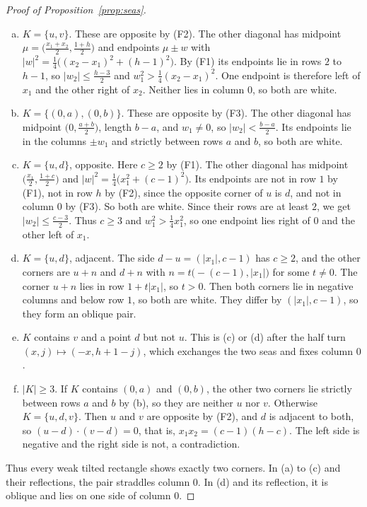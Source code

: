 \begin{proof}[Proof of Proposition~\ref{prop:seas}]
\begin{enumerate}[(a)]
\item $K=\{u,v\}$. These are opposite by (F2). The other diagonal has midpoint
$\mu=\bigl(\frac{x_1+x_2}2,\frac{1+h}2\bigr)$ and endpoints $\mu\pm w$ with
$|w|^2=\frac14\bigl((x_2-x_1)^2+(h-1)^2\bigr)$. By (F1) its endpoints lie in rows $2$ to $h-1$,
so $|w_2|\le\frac{h-3}2$ and $w_1^2>\frac14(x_2-x_1)^2$. One endpoint is therefore left of $x_1$ and the other right of $x_2$.
Neither lies in column $0$, so both are white.
\item $K=\{(0,a),(0,b)\}$. These are opposite by (F3). The other diagonal has midpoint
$\bigl(0,\frac{a+b}2\bigr)$, length $b-a$, and $w_1\ne0$, so $|w_2|<\frac{b-a}2$. Its endpoints
lie in the columns $\pm w_1$ and strictly between rows $a$ and $b$, so both are white.
\item $K=\{u,d\}$, opposite. Here $c\ge2$ by (F1). The other diagonal has midpoint
$\bigl(\frac{x_1}2,\frac{1+c}2\bigr)$ and $|w|^2=\frac14\bigl(x_1^2+(c-1)^2\bigr)$. Its endpoints
are not in row $1$ by (F1), not in row $h$ by (F2), since the opposite corner of $u$ is $d$, and
not in column $0$ by (F3). So both are white. Since their rows are at least $2$, we get
$|w_2|\le\frac{c-3}2$. Thus $c\ge3$ and $w_1^2>\frac14x_1^2$, so one endpoint lies right of $0$ and the other left of $x_1$.
\item $K=\{u,d\}$, adjacent. The side $d-u=(|x_1|,c-1)$ has $c\ge2$, and the other corners are
$u+n$ and $d+n$ with $n=t\bigl(-(c-1),|x_1|\bigr)$ for some $t\ne0$. The corner $u+n$ lies in row
$1+t|x_1|$, so $t>0$. Then both corners lie in negative columns and below row $1$, so both are
white. They differ by $(|x_1|,c-1)$, so they form an oblique pair.
\item $K$ contains $v$ and a point $d$ but not $u$. This is (c) or (d) after the half turn
$(x,j)\mapsto(-x,h+1-j)$, which exchanges the two seas and fixes column $0$.
\item $|K|\ge3$. If $K$ contains $(0,a)$ and $(0,b)$, the other two corners lie strictly between
rows $a$ and $b$ by (b), so they are neither $u$ nor $v$. Otherwise $K=\{u,d,v\}$. Then $u$ and
$v$ are opposite by (F2), and $d$ is adjacent to both, so $(u-d)\cdot(v-d)=0$, that is,
$x_1x_2=(c-1)(h-c)$. The left side is negative and the right side is not, a contradiction.
\end{enumerate}
Thus every weak tilted rectangle shows exactly two corners.
In (a) to (c) and their reflections, the pair straddles column $0$.
In (d) and its reflection, it is oblique and lies on one side of column $0$.


\end{proof}
